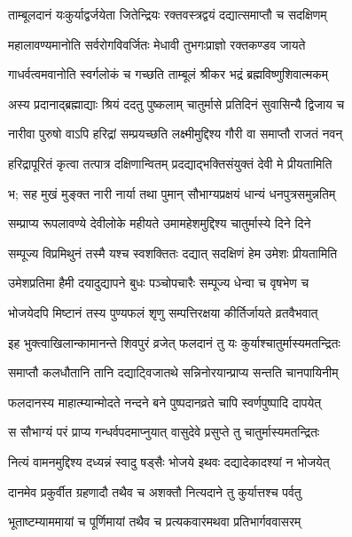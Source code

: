 \twolineshloka
{ताम्बूलदानं यःकुर्याद्वर्जयेता जितेन्द्रियः}
{रक्तवस्त्रद्वयं दद्यात्समाप्तौ च सदक्षिणम्} %

\twolineshloka
{महालावण्यमानोति सर्वरोगविवर्जितः}
{मेधावी तुभगःप्राज्ञो रक्तकण्डव जायते} %

\twolineshloka
{गाधर्वत्वमवानोति स्वर्गलोकं च गच्छति}
{ताम्बूलं श्रीकर भद्रं ब्रह्मविष्णुशिवात्मकम्} %

\twolineshloka
{अस्य प्रदानाद्ब्रह्माद्याः श्रियं ददतु पुष्कलाम्}
{चातुर्मासे प्रतिदिनं सुवासिन्यै द्विजाय च} %

\twolineshloka
{नारीवा पुरुषो वाऽपि हरिद्रां सम्प्रयच्छति}
{लक्ष्मीमुद्दिश्य गौरी वा समाप्तौ राजतं नवन्} %

\twolineshloka
{हरिद्रापूरितं कृत्वा तत्पात्र दक्षिणान्वितम्}
{प्रदद्याद्भक्तिसंयुक्तं देवी मे प्रीयतामिति} %

\twolineshloka
{भ; सह मुखं मुङ्क्त नारी नार्या तथा पुमान्}
{सौभाग्यप्रक्षयं धान्यं धनपुत्रसमुन्नतिम्} %

\twolineshloka
{सम्प्राप्य रूपलावण्ये देवीलोके महीयते}
{उमामहेशमुद्दिश्य चातुर्मास्ये दिने दिने} %

\twolineshloka
{सम्पूज्य विप्रमिथुनं तस्मै यश्च स्वशक्तितः}
{दद्यात् सदक्षिणं हेम उमेशः प्रीयतामिति} %

\twolineshloka
{उमेशप्रतिमा हैमी दयादुद्यापने बुधः}
{पञ्चोपचारैः सम्पूज्य धेन्वा च वृषभेण च} %

\twolineshloka
{भोजयेदपि मिष्टानं तस्य पुण्यफलं शृणु}
{सम्पत्तिरक्षया कीर्तिर्जायते व्रतवैभवात्} %

\twolineshloka
{इह भुक्त्वाखिलान्कामानन्ते शिवपुरं व्रजेत्}
{फलदानं तु यः कुर्याश्चातुर्मास्यमतन्द्रितः} %

\twolineshloka
{समाप्तौ कलधौतानि तानि दद्याट्विजातथे}
{सन्निनोरयान्प्राप्य सन्तति चानपायिनीम्} %

\twolineshloka
{फलदानस्य माहात्म्यान्मोदते नन्दने बने}
{पुष्पदानव्रते चापि स्वर्णपुष्पादि दापयेत्} %

\twolineshloka
{स सौभाग्यं परं प्राप्य गन्धर्वपदमाप्नुयात्}
{वासुदेवे प्रसुप्ते तु चातुर्मास्यमतन्द्रितः} %

\twolineshloka
{नित्यं वामनमुद्दिश्य दध्यन्नं स्वादु षड्सैः}
{भोजये इथवः दद्यादेकादश्यां न भोजयेत्} %

\twolineshloka
{दानमेव प्रकुर्वीत ग्रहणादौ तथैव च}
{अशक्तौ नित्यदाने तु कुर्यात्तश्च पर्वतु} %

\twolineshloka
{भूताष्टम्याममायां च पूर्णिमायां तथैव च}
{प्रत्यकवारमथवा प्रतिभार्गववासरम्} %

